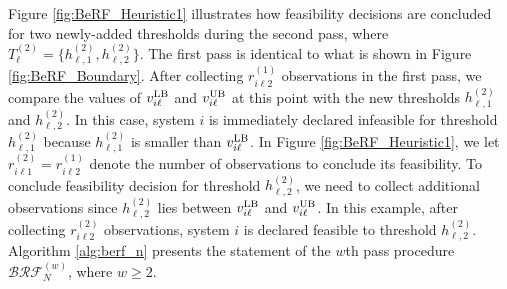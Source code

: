 \documentclass[11pt]{article}
\begin{document}
Figure \ref{fig:BeRF_Heuristic1} illustrates how feasibility decisions are concluded for two newly-added thresholds during the second pass, where $T_\ell^{(2)}=\{h_{\ell, 1}^{(2)}, h_{\ell, 2}^{(2)}\}$. The first pass is identical to what is shown in Figure \ref{fig:BeRF_Boundary}. After collecting $r_{i\ell 2}^{(1)}$ observations in the first pass, we compare the values of $v_{i\ell}^{\rm LB}$ and $v_{i\ell}^{\rm UB}$ at this point with the new thresholds $h_{\ell, 1}^{(2)}$ and $h_{\ell, 2}^{(2)}$. In this case, system $i$ is immediately declared infeasible for threshold $h_{\ell, 1}^{(2)}$ because $h_{\ell, 1}^{(2)}$ is smaller than $v_{i\ell}^{\rm LB}$. In Figure \ref{fig:BeRF_Heuristic1}, we let $r_{i\ell 1}^{(2)}=r_{i\ell 2}^{(1)}$ denote the number of observations to conclude its feasibility. To conclude feasibility decision for threshold $h_{\ell,2}^{(2)}$, we need to collect additional observations since $h_{\ell,2}^{(2)}$ lies between $v_{i\ell}^{\rm LB}$ and $v_{i\ell}^{\rm UB}$. In this example, after collecting $r_{i\ell 2}^{(2)}$ observations, system $i$ is declared feasible to threshold $h_{\ell,2}^{(2)}$.
Algorithm \ref{alg:berf_n} presents the statement of the $w$th pass procedure $\mathcal{BRF}_N^{(w)}$, where $w\geq 2$.
\end{document}
